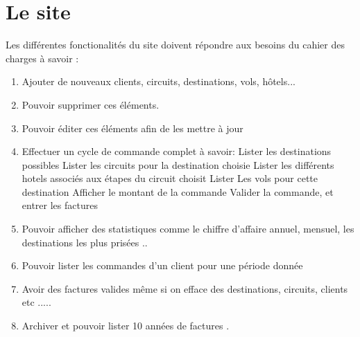 \section{Le site}
Les diff\'erentes fonctionalit\'es du site doivent r\'epondre aux besoins du cahier des charges \`a savoir :

\begin{enumerate}
\item Ajouter de nouveaux clients, circuits, destinations, vols, h\^otels...
\item Pouvoir supprimer ces \'el\'ements.
\item Pouvoir \'editer ces \'el\'ements afin de les mettre \`a jour
\item Effectuer un cycle de commande complet \`a savoir:
\subitem Lister les destinations possibles
\subitem Lister les circuits pour la destination choisie
\subitem Lister les diff\'erents hotels associ\'es aux \'etapes du circuit choisit
\subitem Lister Les vols pour cette destination
\subitem Afficher le montant de la commande
\subitem Valider la commande, et entrer les factures

\item Pouvoir afficher des statistiques comme le chiffre d'affaire annuel, mensuel, les destinations les plus pris\'ees ..
\item Pouvoir lister les commandes d'un client pour une p\'eriode donn\'ee
\item Avoir des factures valides m\^eme si on efface des destinations, circuits, clients etc .....
\item Archiver et pouvoir lister 10 ann\'ees de factures .


\end{enumerate}